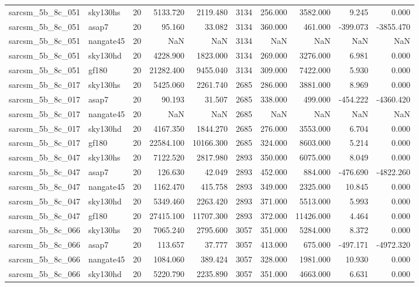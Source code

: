 \documentclass{article}
\begin{document}
\begin{longtable}{llrrrrrrrr}
sarcsm\_5b\_8c\_051 & sky130hs & 20 & 5133.720 & 2119.480 & 3134 & 256.000 & 3582.000 & 9.245 & 0.000 \\
sarcsm\_5b\_8c\_051 & asap7 & 20 & 95.160 & 33.082 & 3134 & 360.000 & 461.000 & -399.073 & -3855.470 \\
sarcsm\_5b\_8c\_051 & nangate45 & 20 & NaN & NaN & 3134 & NaN & NaN & NaN & NaN \\
sarcsm\_5b\_8c\_051 & sky130hd & 20 & 4228.900 & 1823.000 & 3134 & 269.000 & 3276.000 & 6.981 & 0.000 \\
sarcsm\_5b\_8c\_051 & gf180 & 20 & 21282.400 & 9455.040 & 3134 & 309.000 & 7422.000 & 5.930 & 0.000 \\
sarcsm\_5b\_8c\_017 & sky130hs & 20 & 5425.060 & 2261.740 & 2685 & 286.000 & 3881.000 & 8.969 & 0.000 \\
sarcsm\_5b\_8c\_017 & asap7 & 20 & 90.193 & 31.507 & 2685 & 338.000 & 499.000 & -454.222 & -4360.420 \\
sarcsm\_5b\_8c\_017 & nangate45 & 20 & NaN & NaN & 2685 & NaN & NaN & NaN & NaN \\
sarcsm\_5b\_8c\_017 & sky130hd & 20 & 4167.350 & 1844.270 & 2685 & 276.000 & 3553.000 & 6.704 & 0.000 \\
sarcsm\_5b\_8c\_017 & gf180 & 20 & 22584.100 & 10166.300 & 2685 & 324.000 & 8603.000 & 5.214 & 0.000 \\
sarcsm\_5b\_8c\_047 & sky130hs & 20 & 7122.520 & 2817.980 & 2893 & 350.000 & 6075.000 & 8.049 & 0.000 \\
sarcsm\_5b\_8c\_047 & asap7 & 20 & 126.630 & 42.049 & 2893 & 452.000 & 884.000 & -476.690 & -4822.260 \\
sarcsm\_5b\_8c\_047 & nangate45 & 20 & 1162.470 & 415.758 & 2893 & 349.000 & 2325.000 & 10.845 & 0.000 \\
sarcsm\_5b\_8c\_047 & sky130hd & 20 & 5349.460 & 2263.420 & 2893 & 371.000 & 5513.000 & 5.993 & 0.000 \\
sarcsm\_5b\_8c\_047 & gf180 & 20 & 27415.100 & 11707.300 & 2893 & 372.000 & 11426.000 & 4.464 & 0.000 \\
sarcsm\_5b\_8c\_066 & sky130hs & 20 & 7065.240 & 2795.600 & 3057 & 351.000 & 5284.000 & 8.372 & 0.000 \\
sarcsm\_5b\_8c\_066 & asap7 & 20 & 113.657 & 37.777 & 3057 & 413.000 & 675.000 & -497.171 & -4972.320 \\
sarcsm\_5b\_8c\_066 & nangate45 & 20 & 1084.060 & 389.424 & 3057 & 328.000 & 1981.000 & 10.930 & 0.000 \\
sarcsm\_5b\_8c\_066 & sky130hd & 20 & 5220.790 & 2235.890 & 3057 & 351.000 & 4663.000 & 6.631 & 0.000 \\

\end{longtable}
\end{document}

